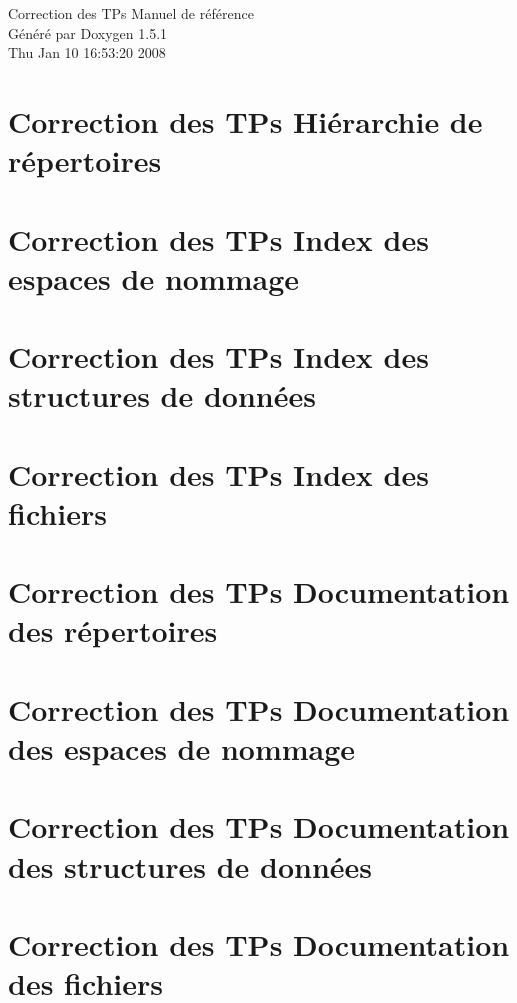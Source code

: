 \documentclass[a4paper]{book}
\begin{document}
\begin{titlepage}
\vspace*{7cm}
\begin{center}
{\Large Correction des TPs Manuel de r\'{e}f\'{e}rence}\\
\vspace*{1cm}
{\large G\'{e}n\'{e}r\'{e} par Doxygen 1.5.1}\\
\vspace*{0.5cm}
{\small Thu Jan 10 16:53:20 2008}\\
\end{center}
\end{titlepage}
\clearemptydoublepage
{}
\tableofcontents
\clearemptydoublepage
{}
\chapter{Correction des TPs Hi\'{e}rarchie de r\'{e}pertoires}

\chapter{Correction des TPs Index des espaces de nommage}

\chapter{Correction des TPs Index des structures de donn\'{e}es}

\chapter{Correction des TPs Index des fichiers}

\chapter{Correction des TPs Documentation des r\'{e}pertoires}





\chapter{Correction des TPs Documentation des espaces de nommage}

\chapter{Correction des TPs Documentation des structures de donn\'{e}es}





\chapter{Correction des TPs Documentation des fichiers}















\printindex
\end{document}
